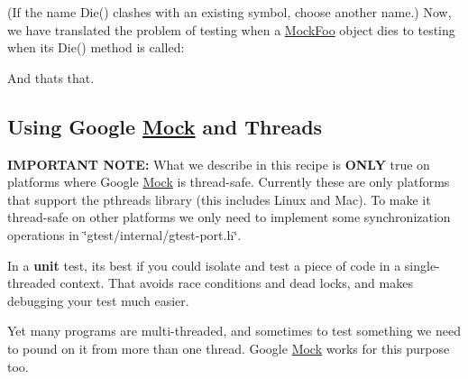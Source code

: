\begin{DoxyCode}{0}
\DoxyCodeLine{\};}
\end{DoxyCode}


(If the name {\ttfamily Die()} clashes with an existing symbol, choose another name.) Now, we have translated the problem of testing when a {\ttfamily \mbox{\hyperlink{class_mock_foo}{Mock\+Foo}}} object dies to testing when its {\ttfamily Die()} method is called\+:


\begin{DoxyCode}{0}
\DoxyCodeLine{\{}
\DoxyCodeLine{}
\DoxyCodeLine{\}}
\end{DoxyCode}


And that\textquotesingle{}s that.

\subsection*{Using Google \mbox{\hyperlink{class_mock}{Mock}} and Threads}

{\bfseries{I\+M\+P\+O\+R\+T\+A\+NT N\+O\+TE\+:}} What we describe in this recipe is {\bfseries{O\+N\+LY}} true on platforms where Google \mbox{\hyperlink{class_mock}{Mock}} is thread-\/safe. Currently these are only platforms that support the pthreads library (this includes Linux and Mac). To make it thread-\/safe on other platforms we only need to implement some synchronization operations in {\ttfamily \char`\"{}gtest/internal/gtest-\/port.\+h\char`\"{}}.

In a {\bfseries{unit}} test, it\textquotesingle{}s best if you could isolate and test a piece of code in a single-\/threaded context. That avoids race conditions and dead locks, and makes debugging your test much easier.

Yet many programs are multi-\/threaded, and sometimes to test something we need to pound on it from more than one thread. Google \mbox{\hyperlink{class_mock}{Mock}} works for this purpose too.

